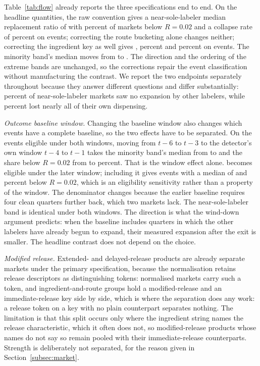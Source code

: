 \documentclass[pdflatex,sn-vancouver-num,Numbered]{sn-jnl}
\begin{document}
Table~\ref{tab:flow} already reports the three specifications end to end. On the headline
quantities, the raw convention gives a near-sole-labeler median replacement ratio of \nSpecASoleMed with
\nSpecASoleLt percent of markets below $R=0.02$ and a collapse rate of \nSpecASoleColl percent on
\nSpecASoleN events; correcting the route bucketing alone changes neither; correcting the ingredient
key as well gives \nSoleMedian, \nSoleLtTwo percent and \nTreatedRate percent on \nSpecCSoleN events.
The minority band's median moves from \nSpecAMinMed to \nSpecCMinMed. The direction and the ordering of the extreme bands are unchanged, so the corrections
repair the event classification without manufacturing the contrast. We report the two endpoints
separately throughout because they answer different questions and differ substantially: \nSoleLtTwo
percent of near-sole-labeler markets saw no expansion by other labelers, while \nTreatedRate percent lost
nearly all of their own dispensing.

\emph{Outcome baseline window.} Changing the baseline window also changes which events have a
complete baseline, so the two effects have to be separated. On the \nBaseCommonN events eligible
under both windows, moving from $t-6$ to $t-3$ to the detector's own window $t-4$ to $t-1$ takes
the minority band's median from \nBaseCommonPriMed to \nBaseCommonAltMed and the share below
$R=0.02$ from \nBaseCommonPriPct to \nBaseCommonAltPct percent. That is the window effect alone.
\nBaseOnlyAltPhrase becomes eligible under the later window; including it gives
\nAltN events with a median of \nAltMedian and \nAltPct percent below $R=0.02$, which is an
eligibility sensitivity rather than a property of the window. The denominator changes because the
earlier baseline requires four clean quarters further back, which two markets lack. The
near-sole-labeler band is identical under both windows. The direction is what the wind-down argument predicts: when
the baseline includes quarters in which the other labelers have already begun to expand, their
measured expansion after the exit is smaller. The headline contrast does not depend on the
choice.

\emph{Modified release.} Extended- and delayed-release products are already separate markets
under the primary specification, because the normalisation retains release descriptors as
distinguishing tokens: \nRelTokenMarkets normalised markets carry such a token, and
\nRelBothGroups ingredient-and-route groups hold a modified-release and an immediate-release key
side by side, which is where the separation does any work: a release token on a key with no
plain counterpart separates nothing. The limitation is that
this split occurs only where the ingredient string names the release characteristic, which it
often does not, so modified-release products whose names do not say so remain pooled with their
immediate-release counterparts. Strength is deliberately not separated, for the reason given in
Section~\ref{subsec:market}.
\end{document}
